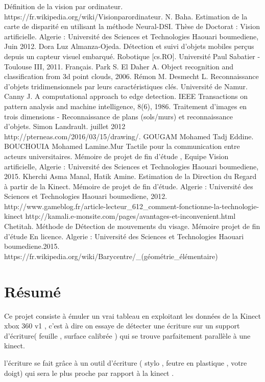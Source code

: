 \documentclass[12pt,a4paper,oneside]{book}
\begin{document}
	
	
	
	\newpage
	\begin{thebibliography}{20}
		
		 Définition de la vision par ordinateur. https://fr.wikipedia.org/wiki/Visionparordinateur.
		 N. Baha. Estimation de la carte de disparité en utilisant la méthode Neural-DSI. Thèse de Doctorat : Vision artificielle. Algerie : Université des Sciences et Technologies Haouari boumediene, Juin 2012.
		 Dora Luz Almanza-Ojeda.  Détection et suivi d’objets mobiles perçus depuis un capteur visuel embarqué. Robotique [cs.RO]. Université Paul Sabatier - Toulouse III, 2011.  Français.
		 Park S. El Daher A. Object recognition and classification from 3d point clouds, 2006.
		 Rémon M. Desmecht L. Reconnaissance d’objets tridimensionnels par leurs caractéristiques	clés. Université de Namur.
		 Canny J. A computational approach to edge detection. IEEE Transactions on pattern analysis and machine intelligence, 8(6), 1986.
		Traitement d’images en trois dimensions - Reconnaissance de plans (sols/murs) et reconnaissance d’objets. Simon Landrault. juillet 2012
		 http://pterneas.com/2016/03/15/drawing/.
		GOUGAM Mohamed Tadj Eddine.
		BOUCHOUIA Mohamed Lamine.Mur Tactile pour la communication entre acteurs universitaires. Mémoire de projet de fin d'étude , Equipe Vision artificielle, Algerie : Université des Sciences et Technologies Haouari boumediene, 2015.
		 Kherchi Asma Manal, Hatik Amine. Estimation de la Direction du Regard à partir de la Kinect. Mémoire de projet de fin d’étude. Algerie : Université des Sciences et Technologies Haouari boumediene, 2012.
		 http://www.gameblog.fr/article-lecteur\_612\_comment-fonctionne-la-technologie-kinect
		 http://kamali.e-monsite.com/pages/avantages-et-inconvenient.html
		 Chetitah. Méthode de Détection de mouvements du visage. Mémoire projet de fin d'étude En licence. Algerie : Université des Sciences et Technologies Haouari boumediene.2015.	 
		 https://fr.wikipedia.org/wiki/Barycentre/\_(géométrie\_élémentaire)		
	\end{thebibliography}
	\chapter*{Résumé}
	Ce projet consiste à émuler un vrai tableau  en exploitant les données de la Kinect xbox 360 v1 , c'est à dire on essaye de détecter une écriture sur un support d'écriture( feuille , surface calibrée ) qui se trouve   parfaitement parallèle à une kinect.
	
	 l'écriture  se fait grâce  à un outil d'écriture ( stylo , feutre en plastique , votre doigt) qui sera le plus proche par rapport à la kinect .
	
	
\end{document}
